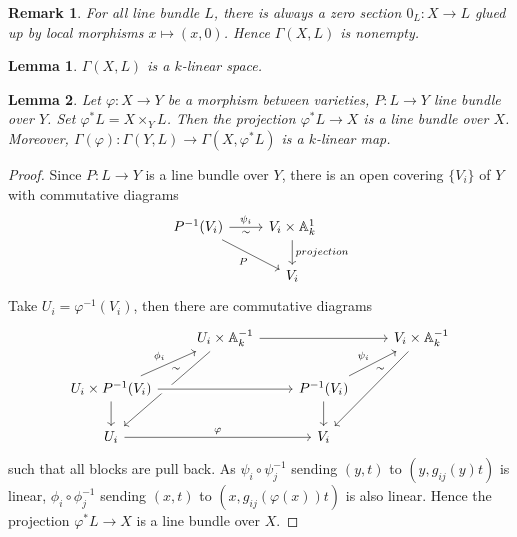 \documentclass{ctexart}
\newtheorem{remark}{Remark}[section]
\newtheorem{lemma}{Lemma}[section]
\begin{document}
\begin{remark}
    For all line bundle $L$, there is always a zero section $0_{L}: X \rightarrow L$ glued up by local morphisms $x \mapsto (x, 0)$.
    Hence $\Gamma(X, L)$ is nonempty.
\end{remark}
\begin{lemma}
    $\Gamma(X, L)$ is a $k$-linear space.
    \label{Lemma 7.1}
\end{lemma}
\begin{lemma}
    Let $\varphi: X \rightarrow Y$ be a morphism between varieties, $P: L \rightarrow Y$ line bundle over $Y$.
    Set $\varphi^{\ast}L = X \times_{Y} L$.
    Then the projection $\varphi^{\ast}L \rightarrow X$ is a line bundle over $X$.
    Moreover, $\Gamma(\varphi): \Gamma(Y, L) \rightarrow \Gamma(X, \varphi^{\ast}L)$ is a $k$-linear map.
    \label{Lemma 7.2}
\end{lemma}
\begin{proof}
    Since $P: L \rightarrow Y$ is a line bundle over $Y$, there is an open covering $\{V_{i}\}$ of $Y$ with commutative diagrams
    \begin{equation}
        \begin{tikzcd}
            P^{-1}(V_{i}) \arrow[r, "\psi_{i}", "\sim" swap] \arrow[rd, "P" swap] &
            V_{i} \times \mathbb{A}_{k}^{1} \arrow[d, "projection"] \\
            & V_{i}   
        \end{tikzcd}
    \end{equation}
    Take $U_{i} = \varphi^{-1}(V_{i})$, then there are commutative diagrams
    \begin{equation}
        \begin{tikzcd}
            & U_{i} \times \mathbb{A}_{k}^{-1} \arrow[rr] \arrow[ddl] &&
            V_{i} \times \mathbb{A}_{k}^{-1} \arrow[ddl] \\
            U_{i} \times P^{-1}(V_{i}) \arrow[ur, "\phi_{i}", "\sim" swap] \arrow[rr, crossing over] \arrow[d] && 
            P^{-1}(V_{i}) \arrow[ur, "\psi_{i}", "\sim" swap] \arrow[d] & \\
            U_{i}  \arrow[rr, "\varphi"] &&
            V_{i} &
        \end{tikzcd}
    \end{equation}
    such that all blocks are pull back.
    As $\psi_{i} \circ \psi_{j}^{-1}$ sending $(y, t)$ to $(y, g_{ij}(y)t)$ is linear, $\phi_{i} \circ \phi_{j}^{-1}$ sending $(x, t)$ to $(x, g_{ij}(\varphi(x))t)$ is also linear.
    Hence the projection $\varphi^{\ast}L \rightarrow X$ is a line bundle over $X$.
\end{proof}
\end{document}
